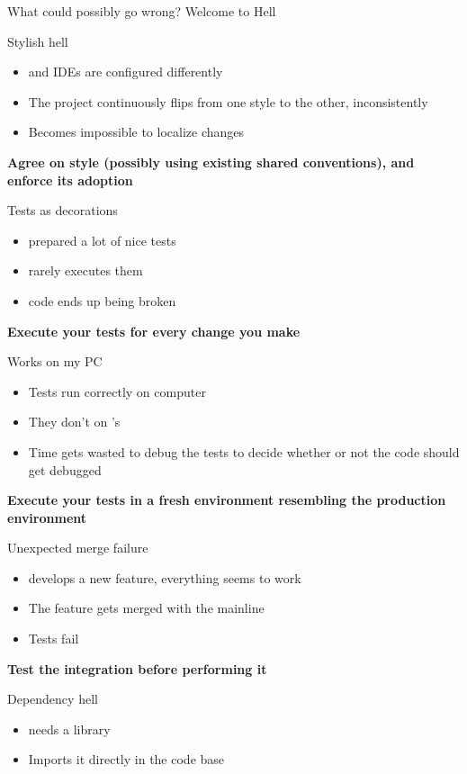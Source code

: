 \documentclass[presentation]{beamer}
\begin{document}
\begin{frame}{What could possibly go wrong? Welcome to Hell }
\begin{block}{Stylish hell}
\begin{itemize}
\begin{itemize}
			\end{itemize}
			\item \baddev{} and \gooddev{} IDEs are configured differently
			\item The project continuously flips from one style to the other, inconsistently
			\item Becomes impossible to localize changes
		\end{itemize}
		\textbf{Agree on style (possibly using existing shared conventions), and enforce its adoption}
	\end{block}
	\begin{block}{Tests as decorations}
		\begin{itemize}
			\item \baddev{} prepared a lot of nice tests
			\item \baddev{} rarely executes them
			\item \baddev{} code ends up being broken
		\end{itemize}
		\textbf{Execute your tests for every change you make}
	\end{block}
	\begin{block}{Works on my PC}
		\begin{itemize}
			\item Tests run correctly on \baddev{} computer
			\item They don't on \gooddev{}'s
			\item Time gets wasted to debug the tests to decide whether or not the code should get debugged
		\end{itemize}
		\textbf{Execute your tests in a fresh environment resembling the production environment}
	\end{block}
	\begin{block}{Unexpected merge failure}
		\begin{itemize}
			\item \baddev{} develops a new feature, everything seems to work
			\item The feature gets merged with the mainline
			\item Tests fail
		\end{itemize}
		\textbf{Test the integration before performing it}
	\end{block}
	\begin{block}{Dependency hell}
		\begin{itemize}
			\item \baddev{} needs a library
			\item Imports it directly in the code base

\end{itemize}
\end{block}
\end{frame}
\end{document}
